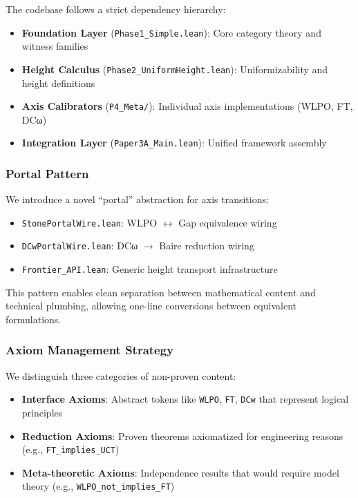 \documentclass[11pt]{article}
\theoremstyle{plain}
\theoremstyle{definition}
\begin{document}
The codebase follows a strict dependency hierarchy:
\begin{itemize}
\item \textbf{Foundation Layer} (\texttt{Phase1\_Simple.lean}): Core category theory and witness families
\item \textbf{Height Calculus} (\texttt{Phase2\_UniformHeight.lean}): Uniformizability and height definitions
\item \textbf{Axis Calibrators} (\texttt{P4\_Meta/}): Individual axis implementations (WLPO, FT, DCω)
\item \textbf{Integration Layer} (\texttt{Paper3A\_Main.lean}): Unified framework assembly
\end{itemize}

\subsubsection{Portal Pattern}

We introduce a novel ``portal'' abstraction for axis transitions:
\begin{itemize}
\item \texttt{StonePortalWire.lean}: WLPO $\leftrightarrow$ Gap equivalence wiring
\item \texttt{DCwPortalWire.lean}: DCω $\rightarrow$ Baire reduction wiring
\item \texttt{Frontier\_API.lean}: Generic height transport infrastructure
\end{itemize}

This pattern enables clean separation between mathematical content and technical plumbing, allowing one-line conversions between equivalent formulations.

\subsubsection{Axiom Management Strategy}

We distinguish three categories of non-proven content:
\begin{itemize}
\item \textbf{Interface Axioms}: Abstract tokens like \texttt{WLPO}, \texttt{FT}, \texttt{DCw} that represent logical principles
\item \textbf{Reduction Axioms}: Proven theorems axiomatized for engineering reasons (e.g., \texttt{FT\_implies\_UCT})
\item \textbf{Meta-theoretic Axioms}: Independence results that would require model theory (e.g., \texttt{WLPO\_not\_implies\_FT})
\end{itemize}
\end{document}

